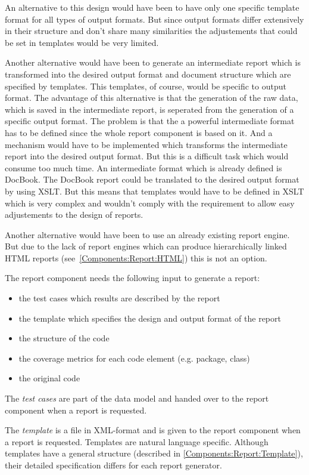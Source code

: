 An alternative to this design would have been to have only one specific template format for all types of output formats. But since output formats differ extensively in their structure and don't share many similarities the adjustements that could be set in templates would be very limited.

Another alternative would have been to generate an intermediate report which is transformed into the desired output format and document structure which are specified by templates. This templates, of course, would be specific to output format. The advantage of this alternative is that the generation of the raw data, which is saved in the intermediate report, is seperated from the generation of a specific output format. The problem is that the a powerful intermediate format has to be defined since the whole report component is based on it. And a mechanism would have to be implemented which transforms the intermediate report into the desired output format. But this is a difficult task which would consume too much time. An intermediate format which is already defined is DocBook. The DocBook report could be translated to the desired output format by using XSLT. But this means that templates would have to be defined in XSLT which is very complex and wouldn't comply with the requirement to allow easy adjustements to the design of reports.

Another alternative would have been to use an already existing report engine. But due to the lack of report engines which can produce hierarchically linked HTML reports (see~\ref{Components:Report:HTML}) this is not an option.

The report component needs the following input to generate a report:
\begin{itemize}
 \item the test cases which results are described by the report
 \item the template which specifies the design and output format of the report
 \item the structure of the code
 \item the coverage metrics for each code element (e.g. package, class)
 \item the original code
\end{itemize}

The \emph{test cases} are part of the data model and handed over to the report component when a report is requested.

The \emph{template} is a file in XML-format and is given to the report component when a report is requested. Templates are natural language specific. Although templates have a general structure (described in \ref{Components:Report:Template}), their detailed specification differs for each report generator.

